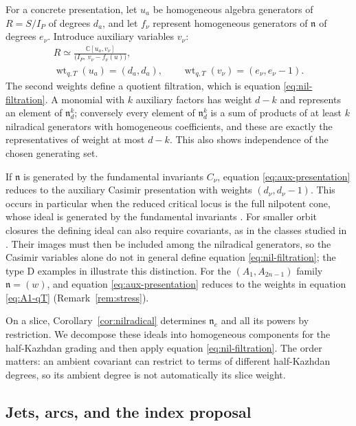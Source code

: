 \documentclass[10pt,reqno]{amsart}
\numberwithin{equation}{section}
\theoremstyle{plain}
\theoremstyle{definition}
\DeclareMathOperator{\wt}{wt}
\begin{document}
For a concrete presentation, let $u_a$ be homogeneous algebra generators of $R=S/I_P$ of degrees $d_a$, and let $f_\nu$ represent homogeneous generators of $\mathfrak{n}$ of degrees $e_\nu$. Introduce auxiliary variables $v_\nu$:
\begin{equation}\label{eq:aux-presentation}
\begin{gathered}
	R\simeq\frac{\mathbb{C}[u_a,v_\nu]}{\big(I_P,\ v_\nu-f_\nu(u)\big)},\\
	\wt_{q,T}(u_a)=(d_a,d_a),\qquad \wt_{q,T}(v_\nu)=(e_\nu,e_\nu-1).
\end{gathered}
\end{equation}
The second weights define a quotient filtration, which is equation \eqref{eq:nil-filtration}. A monomial with $k$ auxiliary factors has weight $d-k$ and represents an element of $\mathfrak{n}^k_d$; conversely every element of $\mathfrak{n}^k_d$ is a sum of products of at least $k$ nilradical generators with homogeneous coefficients, and these are exactly the representatives of weight at most $d-k$. This also shows independence of the chosen generating set.

If $\mathfrak{n}$ is generated by the fundamental invariants $C_\nu$, equation \eqref{eq:aux-presentation} reduces to the auxiliary Casimir presentation with weights $(d_\nu,d_\nu-1)$. This occurs in particular when the reduced critical locus is the full nilpotent cone, whose ideal is generated by the fundamental invariants \cite{Kostant}. For smaller orbit closures the defining ideal can also require covariants, as in the classes studied in \cite{JS}. Their images must then be included among the nilradical generators, so the Casimir variables alone do not in general define equation \eqref{eq:nil-filtration}; the type D examples in \cite{Kang:2026ney} illustrate this distinction. For the $(A_1,A_{2n-1})$ family $\mathfrak{n}=(w)$, and equation \eqref{eq:aux-presentation} reduces to the weights in equation \eqref{eq:A1-qT} (Remark~\ref{rem:stress}).

On a slice, Corollary~\ref{cor:nilradical} determines $\mathfrak{n}_e$ and all its powers by restriction. We decompose these ideals into homogeneous components for the half-Kazhdan grading and then apply equation \eqref{eq:nil-filtration}. The order matters: an ambient covariant can restrict to terms of different half-Kazhdan degrees, so its ambient degree is not automatically its slice weight.

\subsection{Jets, arcs, and the index proposal}\label{sec:arcs}
\end{document}
